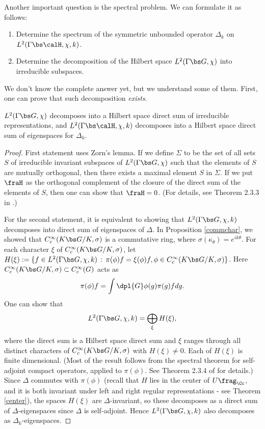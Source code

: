 Another important question is the spectral problem. We can formulate it as follows: 
\begin{enumerate}
\item Determine the spectrum of the symmetric unbounded operator $\Delta_k$ on $L^{2}(\Gamma \bs \calH, \chi, k)$. 
\item Determine the decomposition of the Hilbert space $L^{2}(\Gamma \bs G, \chi)$ into irreducible subspaces. 
\end{enumerate}
We don't know the complete answer yet, but we  understand some of them. First, one can prove that such decomposition \emph{exists}. 
\begin{theorem}
\label{l2decomp}
$L^{2}(\Gamma \bs G, \chi)$ decomposes into a Hilbert space direct sum of  irreducible representations, and $L^{2}(\Gamma\bs\calH, \chi, k)$ decomposes into a Hilbert space direct sum of eigenspaces for $\Delta_k$. 
\end{theorem}
\begin{proof}
First statement uses Zorn's lemma. If we define $\Sigma$ to be the set of all sets $S$ of irreducible invariant subspaces of $L^{2}(\Gamma \bs G, \chi)$ such that the elements of $S$ are mutually orthogonal, then there exists a maximal element $S$ in $\Sigma$. 
If we put $\fraH$ as the orthogonal complement of the closure of the direct sum of the elements of $S$, then one can show that $\fraH = 0$. (For details, see Theorem 2.3.3 in \cite{bu}.)

For the second statement, it is equivalent to showing that $L^{2}(\Gamma \bs G, \chi, k)$ decomposes into direct sum of eigenspaces of $\Delta$. 
In Proposition \ref{commchar}, we showed that $C_{c}^{\infty}(K\bs G /K, \sigma)$ is a commutative ring, where $\sigma(\kappa_{\theta}) = e^{ik\theta}$. 
For each character $\xi$ of $C_{c}^{\infty}(K\bs G/K, \sigma)$, let $H(\xi) := \{f\in L^{2}(\Gamma \bs G, \chi, k)\,:\, \pi(\phi)f = \xi(\phi)f, \phi\in C_{c}^{\infty}(K\bs G/K, \sigma)\}$. 
Here $C_{c}^{\infty}(K\bs G/K, \sigma)\subset C_{c}^{\infty}(G)$ acts as
$$
\pi(\phi)f = \int\dpl{G} \phi(g)\pi(g)f dg. 
$$
One can show that 
$$
L^{2}(\Gamma \bs G, \chi, k) = \bigoplus_{\xi} H(\xi), 
$$
where the direct sum is a Hilbert space direct sum and $\xi$ ranges through all distinct characters of $C_{c}^{\infty}(K\bs G/K, \sigma)$ with $H(\xi)\neq 0$. 
Each of $H(\xi)$ is finite dimensional. (Most of the result follows from the spectral theorem for self-adjoint compact operators, applied to $\pi(\phi)$. See Theorem 2.3.4 of \cite{bu} for details.) 
Since $\Delta$ commutes with $\pi(\phi)$ (recall that $H$ lies in the center of $U\frag_{\Cc}$, and it is both invariant under left and right regular representations - see Theorem \ref{center}), the spaces $H(\xi)$ are $\Delta$-invariant, so these decomposes as a direct sum of $\Delta$-eigenspaces since $\Delta$ is self-adjoint. Hence $L^{2}(\Gamma \bs G, \chi, k)$ also decomposes as $\Delta_k$-eigenspaces. 
\end{proof}
